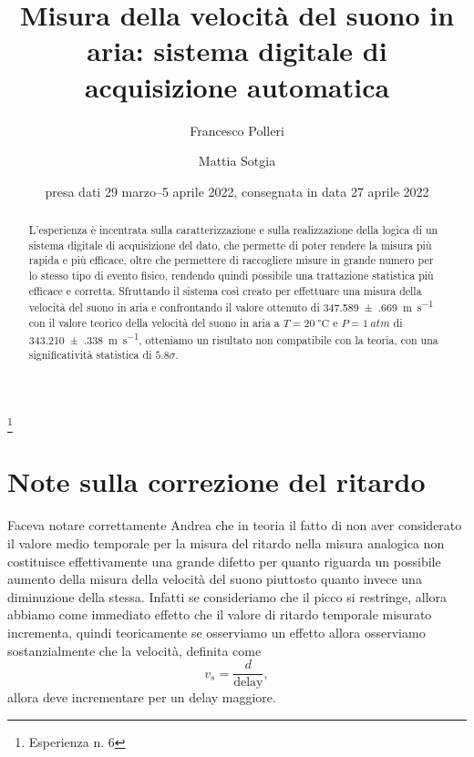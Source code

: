 \documentclass[fleqn]{memo}
\begin{document}
\title{
    Misura della velocità del suono in aria: sistema digitale di acquisizione automatica
}
\thanks{Esperienza n. 6
}

\author{Francesco Polleri}
\author{Mattia Sotgia}


\date{presa dati
    29 marzo--5 aprile 2022, consegnata in data
    27 aprile 2022
}
\revised{\today}

\begin{abstract}
    L'esperienza è incentrata sulla caratterizzazione e sulla realizzazione della logica di un sistema digitale di acquisizione del dato, che permette di poter rendere la misura più rapida e più efficace, oltre che permettere di raccogliere misure in grande numero per lo stesso tipo di evento fisico, rendendo quindi possibile una trattazione statistica più efficace e corretta. Sfruttando il sistema così creato per effettuare una misura della velocità del suono in aria e confrontando il valore ottenuto di \SI{347.589(669)}{\metre\per\second} con il valore teorico della velocità del suono in aria a $T=\SI{20}{\celsius}$ e $P=\SI{1}{atm}$ di \SI{343.210(338)}{\metre\per\second}, otteniamo un risultato non compatibile con la teoria, con una significatività statistica di $5.8\sigma$.
\end{abstract}

\maketitle


\section{Note sulla correzione del ritardo}

Faceva notare correttamente Andrea che in teoria il fatto di non aver considerato il valore medio temporale per la misura del ritardo nella misura analogica non costituisce effettivamente una grande difetto per quanto riguarda un possibile aumento della misura della velocità del suono piuttosto quanto invece una diminuzione della stessa. Infatti se consideriamo che il picco si restringe, allora abbiamo come immediato effetto che il valore di ritardo temporale misurato incrementa, quindi teoricamente se osserviamo un effetto allora osserviamo sostanzialmente che la velocità, definita come \[v_s = \frac{d}{\text{delay}}, \] allora deve incrementare per un delay maggiore.
\end{document}

